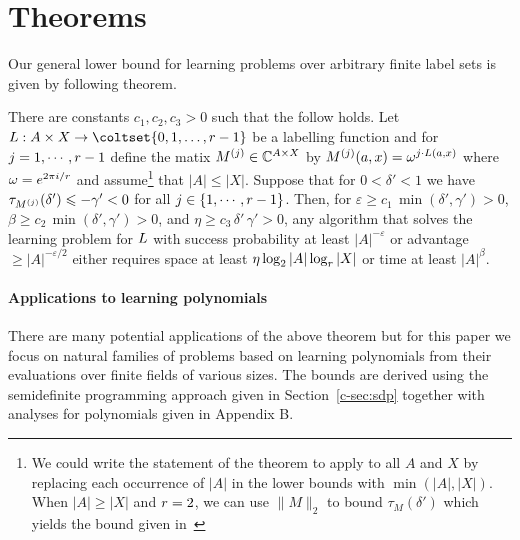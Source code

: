 \section{Theorems}
\label{sec:multivalued}
\label{sec:theorems}


Our general lower bound for learning problems over arbitrary finite label sets
is given by following theorem.

\begin{theorem}
\label{c-thm:mainlb}
There are constants $c_1,c_2,c_3>0$ such that the follow holds.
Let $\fun:A\times X\rightarrow \coltset{0,1,\ldots, \cp-1}$ be a labelling
function 
and for $j=1,\cdots,r-1$ define the matix $M^{(j)}\in \mathbb{C}^{A\times X}$
by $M^{(j)}(a,x)=\omega^{j\cdot L(a,x)}$ where $\omega=e^{2\pi i/r}$ and 
assume\footnote{We could write the statement of the theorem to apply to all $A$ and $X$ by
replacing each occurrence of $|A|$ in the lower bounds with $\min(|A|,|X|)$.
When $|A|\ge |X|$ and $r=2$, we can use $\|M\|_2$ to
bound $\tau_M(\delta')$ which yields
the bound given in~\cite{DBLP:conf/focs/Raz17}} that $|A|\leq |X|$.
Suppose that for $0<\delta'<1$ we have
 $\tau_{M^{(j)}}(\delta')\leqslant -\gamma'<0$
for all $j\in \{1,\cdots,r-1\}$.
Then, for $\varepsilon\ge c_1\, \min(\delta',\gamma')>0$,
$\beta\ge c_2\, \min(\delta',\gamma')>0$, and $\eta\ge c_3\,\delta'\, \gamma'>0$,
any algorithm that solves the learning problem for $L$ with
success probability at least $|A|^{-\varepsilon}$ or advantage
$\ge |A|^{-\varepsilon/2}$ either requires
space at least $\eta \log_2|A|\log_{r}|X|$ or time at least $|A|^{\beta}$.
\end{theorem}

\paragraph{Applications to learning polynomials}

There are many potential applications of the above theorem but for this paper
we focus on natural families of problems based on learning polynomials from
their evaluations over finite fields of various sizes.  The bounds are 
derived using the semidefinite programming approach given in
Section~\ref{c-sec:sdp} together with analyses for polynomials given
in Appendix B.

